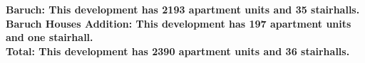 \bf{Baruch}: This development has 2193 apartment units and 35 stairhalls.\\\bf{Baruch Houses Addition}: This development has 197 apartment units and one stairhall.\\\bf{Total}: This development has 2390 apartment units and 36 stairhalls.\\